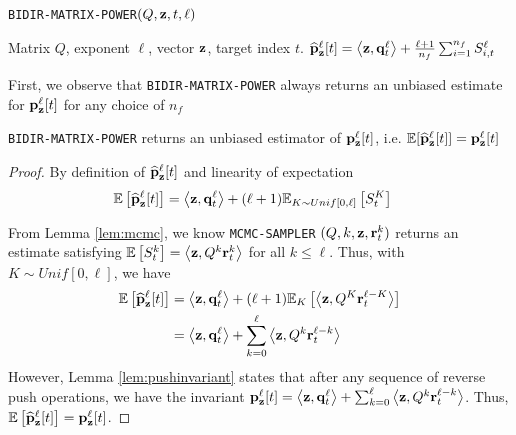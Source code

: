 \begin{algorithm}[ht]
\caption{\texttt{BIDIR-MATRIX-POWER}$(Q, \mathbf{z}, t,\ell)$}
\label{alg:linearsysest}
\begin{algorithmic}[1]
\REQUIRE Matrix $Q$, exponent $\ell$, vector $\mathbf{z}$, target index $t$.
\ENDFOR
\RETURN $\widehat{\mathbf{p}}_\mathbf{z}^{\ell}[t] = \left< \mathbf{z}, \mathbf{q}^{\ell}_t \right> + \frac{\ell+1}{n_f} \sum_{i=1}^{n_f}S_{i,t}^\ell$
\end{algorithmic}
\end{algorithm} 

First, we observe that \texttt{BIDIR-MATRIX-POWER} always returns an unbiased estimate for ${\mathbf{p}}_\mathbf{z}^{\ell}[t]$ for any choice of $n_f$

\begin{lemma}
\label{lem:unbiased}
\texttt{BIDIR-MATRIX-POWER} returns an unbiased estimator of ${\mathbf{p}}_\mathbf{z}^{\ell}[t]$, i.e. $\mathbb{E}[\widehat{\mathbf{p}}_\mathbf{z}^{\ell}[t]] = {\mathbf{p}}_\mathbf{z}^{\ell}[t]$
\end{lemma}

\begin{proof}
By definition of $\widehat{\mathbf{p}}_\mathbf{z}^{\ell}[t]$ and linearity of expectation
\begin{align*}
\mathbb{E}\left[\widehat{\mathbf{p}}_\mathbf{z}^{\ell}[t]\right] 
&= \left<\mathbf{z}, \mathbf{q}_t^{\ell} \right> + (\ell+1)\mathbb{E}_{K \sim Unif[0, \ell]}\left[S_{t}^{K}\right]
\end{align*}

From Lemma \ref{lem:mcmc}, we know \texttt{MCMC-SAMPLER} $(Q, k, \mathbf{z}, \mathbf{r}^{k}_t)$ returns an estimate satisfying $\mathbb{E}\left[S_{t}^{k}\right] = \left< \mathbf{z}, Q^k \mathbf{r}^{k}_t \right>$ for all $k\leq \ell$. Thus, with $K \sim Unif[0, \ell]$, we have
\begin{align*}
\mathbb{E}\left[\widehat{\mathbf{p}}_\mathbf{z}^{\ell}[t] \right] &= \left<\mathbf{z}, \mathbf{q}_t^{\ell} \right> + (\ell+1)\mathbb{E}_K\left[\left< \mathbf{z}, Q^K \mathbf{r}_t^{\ell-K} \right> \right] \\
&= \left<\mathbf{z}, \mathbf{q}_t^{\ell} \right> + \sum_{k = 0}^\ell\left< \mathbf{z}, Q^k \mathbf{r}_t^{\ell-k} \right>
\end{align*}
However, Lemma \ref{lem:pushinvariant} states that after any sequence of reverse push operations, we have the invariant ${\mathbf{p}}_\mathbf{z}^{\ell}[t] = \left<\mathbf{z}, \mathbf{q}_t^{\ell} \right> + \sum_{k=0}^{\ell} \left<\mathbf{z}, Q^k\mathbf{r}_t^{\ell-k}\right>$. Thus, $\mathbb{E}\left[\widehat{\mathbf{p}}_\mathbf{z}^{\ell}[t] \right] = {\mathbf{p}}_\mathbf{z}^{\ell}[t]$.
\end{proof}

